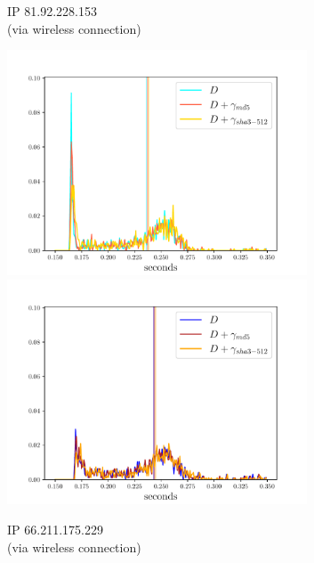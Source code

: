 \documentclass[12pt,a4paper,automark, toc=bib]{scrreprt}
\theoremstyle{definition}
\begin{document}
\begin{figure}
\begin{subfigure}{0.32\textwidth}
					\caption{IP 81.92.228.153\\(via wireless connection)}
				\end{subfigure}
				\centering
				\begin{subfigure}{0.32\textwidth}
					\includegraphics[width=0.98\textwidth]{figures/_MEDIUM_complete_light.pdf}
					\includegraphics[width=0.98\textwidth]{figures/_MEDIUM_complete_dark.pdf}
					\caption{IP 66.211.175.229 \\(via wireless connection)}
				\end{subfigure}
				\centering
				\begin{subfigure}{0.32\textwidth}

\end{subfigure}
\end{figure}
\end{document}
